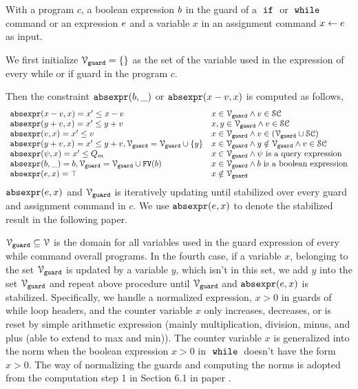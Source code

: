 \begin{defn}
 \label{def:constraint_compute}
 With a program $c$, a boolean expression $b$ in the guard of a $\;\mathtt{if}\;$ or $\;\mathtt{while}\;$ command
 or an expression $e$ and a variable $x$
 in an assignment command $\mathrel{ x \leftarrow e }$ as input.

 We first initialize 
 $\mathcal{V}_{\mathtt{guard}} = \{\}$ as the set of the variable used in the expression of every while or if guard in the program $c$.

 Then the constraint $\mathtt{abs}{\mathtt{expr}}(b, \_)$ or $\mathtt{abs}{\mathtt{expr}}(x - v, x)$ is computed as follows,
 \[
 \begin{array}{ll} 
 \mathtt{abs}{\mathtt{expr}}(x - v, x) = x' \leq x - v & x \in \mathcal{V}_{\mathtt{guard}} \land v \in \mathcal{SC} \\
 \mathtt{abs}{\mathtt{expr}}(y + v, x) = x' \leq y + v & x, y \in \mathcal{V}_{\mathtt{guard}} \land v \in \mathcal{SC} \\
 \mathtt{abs}{\mathtt{expr}}(v, x) = x' \leq v & x \in \mathcal{V}_{\mathtt{guard}} \land v \in (\mathcal{V}_{\mathtt{guard}} \cup \mathcal{SC}) \\
 \mathtt{abs}{\mathtt{expr}}(y + v, x) = x' \leq y + v, 
 \mathcal{V}_{\mathtt{guard}} = \mathcal{V}_{\mathtt{guard}} \cup \{y\} & x \in \mathcal{V}_{\mathtt{guard}} \land y \notin \mathcal{V}_{\mathtt{guard}} \land v \in \mathcal{SC} \\
 \mathtt{abs}{\mathtt{expr}}(\psi, x) = x' \leq Q_m & x \in \mathcal{V}_{\mathtt{guard}} \land \psi \text{ is a query expression} \\
 \mathtt{abs}{\mathtt{expr}}(b, \_) = b, \mathcal{V}_{\mathtt{guard}} = \mathcal{V}_{\mathtt{guard}} \cup 
 \mathtt{FV}(b) & x \in \mathcal{V}_{\mathtt{guard}} \land b \text{ is a boolean expression} \\
 \mathtt{abs}{\mathtt{expr}}(e, x) = \top & x \notin \mathcal{V}_{\mathtt{guard}} \\
 \end{array}
 \]
 $\mathtt{abs}{\mathtt{expr}}(e, x)$ and $\mathcal{V}_{\mathtt{guard}}$ is iteratively updating until stabilized over every guard and assignment command in $c$.
 We use $\mathtt{abs}{\mathtt{expr}}(e, x)$
 to denote the stabilized result in the following paper.
 \end{defn}
%
$\mathcal{V}_{\mathtt{guard}} \subseteq \mathcal{V}$ is the domain for all variables used in the guard expression of every while command overall programs. 
In the fourth case, if a variable $x$, belonging to the set 
$\mathcal{V}_{\mathtt{guard}}$ is updated by a variable $y$, which isn't in this set, 
we add $y$ into the set $\mathcal{V}_{\mathtt{guard}}$ and repeat 
above procedure until $\mathcal{V}_{\mathtt{guard}}$ and $\mathtt{abs}{\mathtt{expr}}(e, x)$ is stabilized. 
Specifically,
we handle a normalized expression, $x > 0$
in guards of while loop headers, and 
the counter variable $x$ only increases, decreases, or is reset by 
simple arithmetic expression (mainly multiplication, division, minus, and plus (able to extend to max and min)). 
The counter variable $x$ is generalized into the norm when the boolean expression $x > 0$
in $\;\mathtt{while}\;$ doesn't have the form $x > 0$.
The way of normalizing the guards and computing the norms is adopted from the computation step 1 in Section 6.1 in paper \cite{SinnZV17}. 

